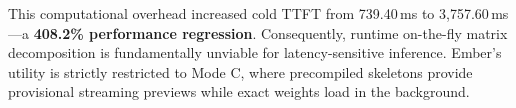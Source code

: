 This computational overhead increased cold TTFT from 739.40\,ms to 3,757.60\,ms—a \textbf{408.2\% performance regression}. Consequently, runtime on-the-fly matrix decomposition is fundamentally unviable for latency-sensitive inference. Ember's utility is strictly restricted to Mode C, where precompiled skeletons provide provisional streaming previews while exact weights load in the background.
